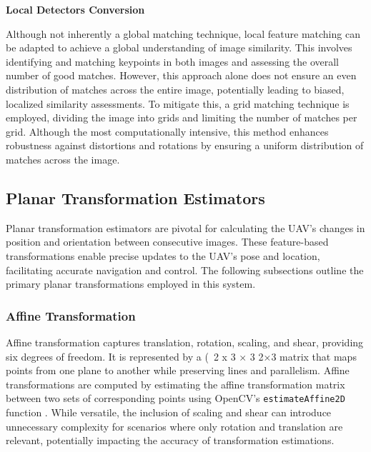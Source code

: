 \textbf{Local Detectors Conversion}

Although not inherently a global matching technique, local feature matching can be adapted to achieve a global understanding of image similarity. This involves identifying and matching keypoints in both images and assessing the overall number of good matches. However, this approach alone does not ensure an even distribution of matches across the entire image, potentially leading to biased, localized similarity assessments. To mitigate this, a grid matching technique is employed, dividing the image into grids and limiting the number of matches per grid. Although the most computationally intensive, this method enhances robustness against distortions and rotations by ensuring a uniform distribution of matches across the image.





\subsection*{Planar Transformation Estimators}

Planar transformation estimators are pivotal for calculating the UAV's changes in position and orientation between consecutive images. These feature-based transformations enable precise updates to the UAV's pose and location, facilitating accurate navigation and control. The following subsections outline the primary planar transformations employed in this system.

\subsubsection{Affine Transformation}

Affine transformation captures translation, rotation, scaling, and shear, providing six degrees of freedom. It is represented by a (\ 2 x 3 
×
3
2×3 matrix that maps points from one plane to another while preserving lines and parallelism. Affine transformations are computed by estimating the affine transformation matrix between two sets of corresponding points using OpenCV's \texttt{estimateAffine2D} function \cite{opencv_warp_affine}. While versatile, the inclusion of scaling and shear can introduce unnecessary complexity for scenarios where only rotation and translation are relevant, potentially impacting the accuracy of transformation estimations.

